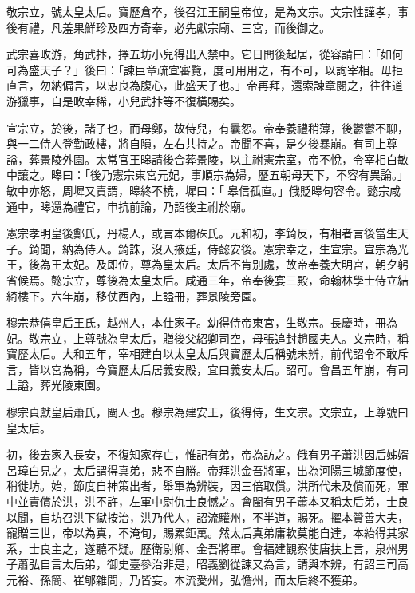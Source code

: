 \begin{pinyinscope}
 敬宗立，號太皇太后。寶歷倉卒，後召江王嗣皇帝位，是為文宗。文宗性謹孝，事後有禮，凡羞果鮮珍及四方奇奉，必先獻宗廟、三宮，而後御之。



 武宗喜畋游，角武抃，擇五坊小兒得出入禁中。它日問後起居，從容請曰：「如何可為盛天子？」後曰：「諫巨章疏宜審覽，度可用用之，有不可，以詢宰相。毋拒直言，勿納偏言，以忠良為腹心，此盛天子也。」帝再拜，還索諫章閱之，往往道游獵事，自是畋幸稀，小兒武抃等不復橫賜矣。



 宣宗立，於後，諸子也，而母鄭，故侍兒，有曩怨。帝奉養禮稍薄，後鬱鬱不聊，與一二侍人登勤政樓，將自隕，左右共持之。帝聞不喜，是夕後暴崩。有司上尊謚，葬景陵外園。太常官王暤請後合葬景陵，以主祔憲宗室，帝不悅，令宰相白敏中讓之。暤曰：「後乃憲宗東宮元妃，事順宗為婦，歷五朝母天下，不容有異論。」敏中亦怒，周墀又責謂，暤終不橈，墀曰：「皋信孤直。」俄貶暤句容令。懿宗咸通中，暤還為禮官，申抗前論，乃詔後主祔於廟。



 憲宗孝明皇後鄭氏，丹楊人，或言本爾硃氏。元和初，李錡反，有相者言後當生天子。錡聞，納為侍人。錡誅，沒入掖廷，侍懿安後。憲宗幸之，生宣宗。宣宗為光王，後為王太妃。及即位，尊為皇太后。太后不肯別處，故帝奉養大明宮，朝夕躬省候焉。懿宗立，尊後為太皇太后。咸通三年，帝奉後宴三殿，命翰林學士侍立結綺樓下。六年崩，移仗西內，上謚冊，葬景陵旁園。



 穆宗恭僖皇后王氏，越州人，本仕家子。幼得侍帝東宮，生敬宗。長慶時，冊為妃。敬宗立，上尊號為皇太后，贈後父紹卿司空，母張追封趙國夫人。文宗時，稱寶歷太后。大和五年，宰相建白以太皇太后與寶歷太后稱號未辨，前代詔令不敢斥言，皆以宮為稱，今寶歷太后居義安殿，宜曰義安太后。詔可。會昌五年崩，有司上謚，葬光陵東園。



 穆宗貞獻皇后蕭氏，閩人也。穆宗為建安王，後得侍，生文宗。文宗立，上尊號曰皇太后。



 初，後去家入長安，不復知家存亡，惟記有弟，帝為訪之。俄有男子蕭洪因后姊婿呂璋白見之，太后謂得真弟，悲不自勝。帝拜洪金吾將軍，出為河陽三城節度使，稍徙坊。始，節度自神策出者，舉軍為辨裝，因三倍取償。洪所代未及償而死，軍中並責償於洪，洪不許，左軍中尉仇士良憾之。會閩有男子蕭本又稱太后弟，士良以聞，自坊召洪下獄按治，洪乃代人，詔流驩州，不半道，賜死。擢本贊善大夫，寵贈三世，帝以為真，不淹旬，賜累鉅萬。然太后真弟庸軟莫能自達，本紿得其家系，士良主之，遂聽不疑。歷衛尉卿、金吾將軍。會福建觀察使唐扶上言，泉州男子蕭弘自言太后弟，御史臺參治非是，昭義劉從諫又為言，請與本辨，有詔三司高元裕、孫簡、崔郇雜問，乃皆妄。本流愛州，弘儋州，而太后終不獲弟。




\end{pinyinscope}
